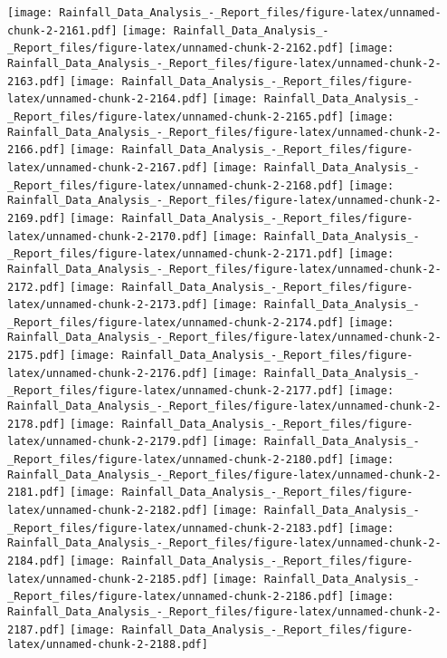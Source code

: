 \documentclass[
]{article}
\begin{document}
\texttt{[image: Rainfall\_Data\_Analysis\_-\_Report\_files/figure-latex/unnamed-chunk-2-2161.pdf]}
\texttt{[image: Rainfall\_Data\_Analysis\_-\_Report\_files/figure-latex/unnamed-chunk-2-2162.pdf]}
\texttt{[image: Rainfall\_Data\_Analysis\_-\_Report\_files/figure-latex/unnamed-chunk-2-2163.pdf]}
\texttt{[image: Rainfall\_Data\_Analysis\_-\_Report\_files/figure-latex/unnamed-chunk-2-2164.pdf]}
\texttt{[image: Rainfall\_Data\_Analysis\_-\_Report\_files/figure-latex/unnamed-chunk-2-2165.pdf]}
\texttt{[image: Rainfall\_Data\_Analysis\_-\_Report\_files/figure-latex/unnamed-chunk-2-2166.pdf]}
\texttt{[image: Rainfall\_Data\_Analysis\_-\_Report\_files/figure-latex/unnamed-chunk-2-2167.pdf]}
\texttt{[image: Rainfall\_Data\_Analysis\_-\_Report\_files/figure-latex/unnamed-chunk-2-2168.pdf]}
\texttt{[image: Rainfall\_Data\_Analysis\_-\_Report\_files/figure-latex/unnamed-chunk-2-2169.pdf]}
\texttt{[image: Rainfall\_Data\_Analysis\_-\_Report\_files/figure-latex/unnamed-chunk-2-2170.pdf]}
\texttt{[image: Rainfall\_Data\_Analysis\_-\_Report\_files/figure-latex/unnamed-chunk-2-2171.pdf]}
\texttt{[image: Rainfall\_Data\_Analysis\_-\_Report\_files/figure-latex/unnamed-chunk-2-2172.pdf]}
\texttt{[image: Rainfall\_Data\_Analysis\_-\_Report\_files/figure-latex/unnamed-chunk-2-2173.pdf]}
\texttt{[image: Rainfall\_Data\_Analysis\_-\_Report\_files/figure-latex/unnamed-chunk-2-2174.pdf]}
\texttt{[image: Rainfall\_Data\_Analysis\_-\_Report\_files/figure-latex/unnamed-chunk-2-2175.pdf]}
\texttt{[image: Rainfall\_Data\_Analysis\_-\_Report\_files/figure-latex/unnamed-chunk-2-2176.pdf]}
\texttt{[image: Rainfall\_Data\_Analysis\_-\_Report\_files/figure-latex/unnamed-chunk-2-2177.pdf]}
\texttt{[image: Rainfall\_Data\_Analysis\_-\_Report\_files/figure-latex/unnamed-chunk-2-2178.pdf]}
\texttt{[image: Rainfall\_Data\_Analysis\_-\_Report\_files/figure-latex/unnamed-chunk-2-2179.pdf]}
\texttt{[image: Rainfall\_Data\_Analysis\_-\_Report\_files/figure-latex/unnamed-chunk-2-2180.pdf]}
\texttt{[image: Rainfall\_Data\_Analysis\_-\_Report\_files/figure-latex/unnamed-chunk-2-2181.pdf]}
\texttt{[image: Rainfall\_Data\_Analysis\_-\_Report\_files/figure-latex/unnamed-chunk-2-2182.pdf]}
\texttt{[image: Rainfall\_Data\_Analysis\_-\_Report\_files/figure-latex/unnamed-chunk-2-2183.pdf]}
\texttt{[image: Rainfall\_Data\_Analysis\_-\_Report\_files/figure-latex/unnamed-chunk-2-2184.pdf]}
\texttt{[image: Rainfall\_Data\_Analysis\_-\_Report\_files/figure-latex/unnamed-chunk-2-2185.pdf]}
\texttt{[image: Rainfall\_Data\_Analysis\_-\_Report\_files/figure-latex/unnamed-chunk-2-2186.pdf]}
\texttt{[image: Rainfall\_Data\_Analysis\_-\_Report\_files/figure-latex/unnamed-chunk-2-2187.pdf]}
\texttt{[image: Rainfall\_Data\_Analysis\_-\_Report\_files/figure-latex/unnamed-chunk-2-2188.pdf]}
\end{document}
